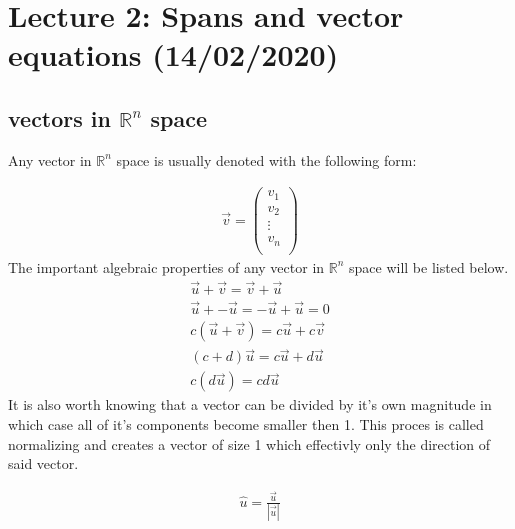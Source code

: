 \documentclass[11pt, a4paper]{article}
\begin{document}
\setcounter{section}{1}
\section{Lecture 2: Spans and vector equations (14/02/2020)}

\subsection{vectors in $\mathbb{R}^n$ space}
Any vector in $\mathbb{R}^n$ space is usually denoted with the following form:

\begin{align*}
    \vec{v} =
    \begin{pmatrix}
        v_1\\
        v_2\\
        \vdots \\
        v_n\\
    \end{pmatrix}
\end{align*}
The important algebraic properties of any vector in $\mathbb{R}^n$ space will be listed below.
\begin{gather}
    \vec{u} + \vec{v} = \vec{v} + \vec{u}\\
    \vec{u} + -\vec{u} = -\vec{u} + \vec{u} = 0\\
    c(\vec{u} + \vec{v}) = c\vec{u} + c\vec{v}\\
    (c + d)\vec{u} = c\vec{u} + d\vec{u}\\
    c(d\vec{u}) = cd\vec{u}
\end{gather}
It is also worth knowing that a vector can be divided by it's own magnitude in which case all of
it's components become smaller then 1. This proces is called normalizing and creates a vector of size 1
which effectivly only the direction of said vector.

\begin{align*}
    \hat{u} = \frac{\vec{u}}{|\vec{u}|}
\end{align*}
\end{document}
